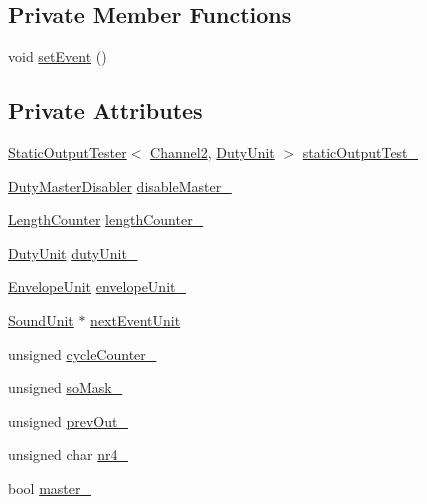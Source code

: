 \subsection*{Private Member Functions}
\begin{DoxyCompactItemize}
\item 
void \hyperlink{classgambatte_1_1Channel2_aef1eba3499906c82587cbd0eb5121e5f}{set\+Event} ()
\end{DoxyCompactItemize}
\subsection*{Private Attributes}
\begin{DoxyCompactItemize}
\item 
\hyperlink{classgambatte_1_1StaticOutputTester}{Static\+Output\+Tester}$<$ \hyperlink{classgambatte_1_1Channel2}{Channel2}, \hyperlink{classgambatte_1_1DutyUnit}{Duty\+Unit} $>$ \hyperlink{classgambatte_1_1Channel2_ade1b5b7d5517320d0a92a5ae0b1af918}{static\+Output\+Test\+\_\+}
\item 
\hyperlink{classgambatte_1_1DutyMasterDisabler}{Duty\+Master\+Disabler} \hyperlink{classgambatte_1_1Channel2_a456784be1b1e094c67e0fa70eecadcd4}{disable\+Master\+\_\+}
\item 
\hyperlink{classgambatte_1_1LengthCounter}{Length\+Counter} \hyperlink{classgambatte_1_1Channel2_aefd094a39e4c8b1a2da1472b85d07861}{length\+Counter\+\_\+}
\item 
\hyperlink{classgambatte_1_1DutyUnit}{Duty\+Unit} \hyperlink{classgambatte_1_1Channel2_a611db79f91b08849e774831891f813d2}{duty\+Unit\+\_\+}
\item 
\hyperlink{classgambatte_1_1EnvelopeUnit}{Envelope\+Unit} \hyperlink{classgambatte_1_1Channel2_a66c56b6990b18999d03129b296165ffc}{envelope\+Unit\+\_\+}
\item 
\hyperlink{classgambatte_1_1SoundUnit}{Sound\+Unit} $\ast$ \hyperlink{classgambatte_1_1Channel2_a575a4077c57d48dbe7f5a6a433c65a78}{next\+Event\+Unit}
\item 
unsigned \hyperlink{classgambatte_1_1Channel2_aecc04331c16f6c32b35ac1094adc7c6c}{cycle\+Counter\+\_\+}
\item 
unsigned \hyperlink{classgambatte_1_1Channel2_ad25cd68978e87a67fb8a68403a7ec921}{so\+Mask\+\_\+}
\item 
unsigned \hyperlink{classgambatte_1_1Channel2_ad897ba192b5c1cd32970e87016c75a29}{prev\+Out\+\_\+}
\item 
unsigned char \hyperlink{classgambatte_1_1Channel2_a4e215e5ebf51ebd69f67847aedba4409}{nr4\+\_\+}
\item 
bool \hyperlink{classgambatte_1_1Channel2_a90a3ad5dba4a1c3630aa702dc90b3428}{master\+\_\+}
\end{DoxyCompactItemize}
